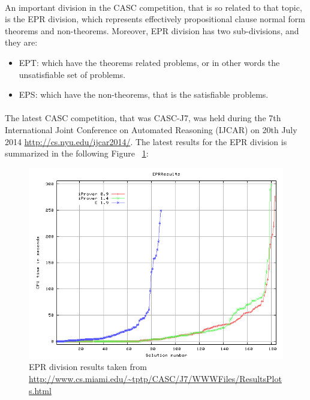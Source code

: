 \paragraph{}
An important division in the CASC competition, that is so related to that topic, is the EPR division, which represents effectively propositional clause normal form theorems and non-theorems. Moreover, EPR division has two sub-divisions, and they are:
	\begin{itemize}
		\item EPT: which have the theorems related problems, or in other words the unsatisfiable set of problems.
		\item EPS: which have the non-theorems, that is the satisfiable problems.
	\end{itemize}
	
\paragraph{}
The latest CASC competition, that was CASC-J7, was held during the 7th International Joint Conference on Automated Reasoning (IJCAR) on 20th July 2014 \url{http://cs.nyu.edu/ijcar2014/}. The latest results for the EPR division is summarized in the following Figure ~\ref{fig:epr_casc_results}:

	\begin{figure}[H]
		\centering
		\includegraphics[scale=0.5]{pictures/EPRResults-Proof-Time.png}
		\caption{EPR division results taken from \url{http://www.cs.miami.edu/~tptp/CASC/J7/WWWFiles/ResultsPlots.html} \label{fig:epr_casc_results}}
	\end{figure}

